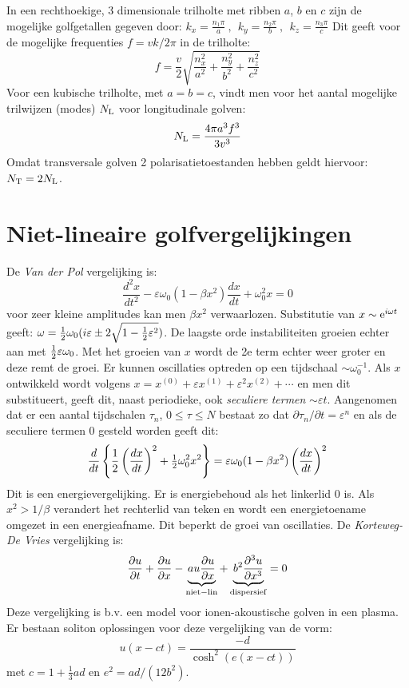 \documentclass[twoside]{report}
\begin{document}
In een rechthoekige, 3 dimensionale trilholte met ribben $a$, $b$ en $c$ zijn
de mogelijke golfgetallen gegeven door:
$\displaystyle k_x=\frac{n_1\pi}{a}~,~~k_y=\frac{n_2\pi}{b}~,~~k_z=\frac{n_3\pi}{c}$
Dit geeft voor de mogelijke frequenties $f=vk/2\pi$ in de trilholte:
\[
f=\frac{v}{2}\sqrt{\frac{n_x^2}{a^2}+\frac{n_y^2}{b^2}+\frac{n_z^2}{c^2}}
\]
Voor een kubische trilholte, met $a=b=c$, vindt men voor het aantal mogelijke
trilwijzen (modes) $N_{\rm L}$ voor longitudinale golven:
\[
N_{\rm L}=\frac{4\pi a^3f^3}{3v^3}
\]
Omdat transversale golven 2 polarisatietoestanden hebben geldt hiervoor:
$N_{\rm T}=2N_{\rm L}$.

\section{Niet-lineaire golfvergelijkingen}
De {\it Van der Pol} vergelijking is:
\[
\frac{d^2x}{dt^2}-\varepsilon\omega_0(1-\beta x^2)\frac{dx}{dt}+\omega_0^2x=0
\]
voor zeer kleine amplitudes kan men $\beta x^2$ verwaarlozen. Substitutie van
$x\sim{\rm e}^{i\omega t}$ geeft:
$\omega=\mbox{$\frac{1}{2}$}\omega_0(i\varepsilon\pm2\sqrt{1-\frac{1}{2}\varepsilon^2})$.
De laagste orde instabiliteiten groeien echter aan met
$\mbox{$\frac{1}{2}$}\varepsilon\omega_0$. Met het groeien van $x$ wordt de 2e term echter
weer groter en deze remt de groei. Er kunnen oscillaties optreden op een
tijdschaal $\sim\omega_0^{-1}$. Als $x$ ontwikkeld wordt volgens
$x=x^{(0)}+\varepsilon x^{(1)}+\varepsilon^2x^{(2)}+\cdots$ en men dit
substitueert, geeft dit, naast periodieke, ook {\it seculiere termen}
$\sim\varepsilon t$. Aangenomen dat er een aantal tijdschalen $\tau_n$,
$0\leq\tau\leq N$ bestaat zo dat $\partial\tau_n/\partial t=\varepsilon^n$ en
als de seculiere termen 0 gesteld worden geeft dit:
\[
\frac{d}{dt}\left\{\frac{1}{2}\left(\frac{dx}{dt}\right)^2+\mbox{$\frac{1}{2}$}\omega_0^2x^2\right\}=
\varepsilon\omega_0(1-\beta x^2)\left(\frac{dx}{dt}\right)^2
\]
Dit is een energievergelijking. Er is energiebehoud als het linkerlid 0 is.
Als $x^2>1/\beta$ verandert het rechterlid van teken en wordt een
energietoename omgezet in een energieafname. Dit beperkt de groei van
oscillaties.
\npar
De {\it Korteweg-De Vries} vergelijking is:
\[
\frac{\partial u}{\partial t}+\frac{\partial u}{\partial x}-\underbrace{au\frac{\partial u}{\partial x}}_{\rm niet-lin}+
\underbrace{b^2\frac{\partial ^3u}{\partial x^3}}_{\rm dispersief}=0
\]
Deze vergelijking is b.v. een model voor ionen-akoustische golven in een
plasma. Er bestaan soliton oplossingen voor deze vergelijking van de vorm:
\[
u(x-ct)=\frac{-d}{\cosh^2(e(x-ct))}
\]
met $c=1+\frac{1}{3}ad$ en $e^2=ad/(12b^2)$.
\end{document}
